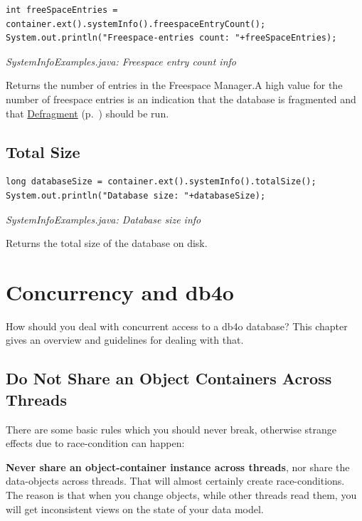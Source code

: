 \begin{lstlisting}
int freeSpaceEntries = container.ext().systemInfo().freespaceEntryCount();
System.out.println("Freespace-entries count: "+freeSpaceEntries);
\end{lstlisting}

{\small\itshape SystemInfoExamples.java: Freespace entry count info\par}
\medskip

Returns the number of entries in the Freespace Manager.A high value for the number of freespace entries is an indication that the database is fragmented and that \hyperref[ref:advanced-topics-defragment]{Defragment} (p.~\pageref{ref:advanced-topics-defragment}) should be run.

\subsection*{Total Size}

\begin{lstlisting}
long databaseSize = container.ext().systemInfo().totalSize();
System.out.println("Database size: "+databaseSize);
\end{lstlisting}

{\small\itshape SystemInfoExamples.java: Database size info\par}
\medskip

Returns the total size of the database on disk.

\section{Concurrency and db4o}
\label{ref:advanced-topics-concurrency}

How should you deal with concurrent access to a db4o database? This chapter gives an overview and guidelines for dealing with that.

\subsection*{Do Not Share an Object Containers Across Threads}

There are some basic rules which you should never break, otherwise strange effects due to race-condition can happen:

\textbf{Never share an object-container instance across threads}, nor share the data-objects across threads. That will almost certainly create race-conditions. The reason is that when you change objects, while other threads read them, you will get inconsistent views on the state of your data model.

